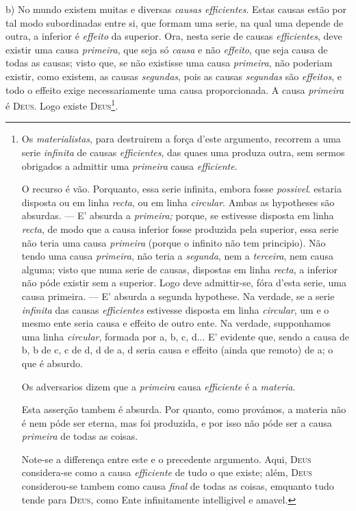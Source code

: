 b) No mundo existem muitas e diversas \emph{causas efficientes}. Estas causas estão por tal modo subordinadas entre si, que formam uma serie, na qual uma depende de outra, a inferior   é \emph{effeito} da superior. Ora, nesta serie de causas \emph{efficientes}, deve existir uma causa \emph{primeira}, que seja só \emph{causa} e não \emph{effeito}, que seja causa de todas as causas; visto que, se não existisse uma  causa \emph{primeira}, não poderiam existir, como existem, as causas \emph{segundas}, pois as causas \emph{segundas} são \emph{effeitos}, e todo o effeito  exige necessariamente uma causa proporcionada. A causa \emph{primeira} é \textsc{Deus}. Logo existe \textsc{Deus}\footnote{Os \emph{materialistas}, para destruirem a força d'este argumento, recorrem a uma serie \emph{infinita} de causas \emph{efficientes}, das quaes uma produza outra, sem sermos obrigados a admittir uma \emph{primeira} causa \emph{efficiente}.\par O recurso é vão. Porquanto, essa serie infinita, embora fosse \emph{possivel}. estaria disposta ou em linha \emph{recta}, ou em linha \emph{circular}. Ambas as hypotheses são absurdas. --- E' absurda a \emph{primeira;} porque, se estivesse disposta em linha \emph{recta}, de modo que a causa inferior fosse produzida pela superior, essa serie não teria uma causa \emph{primeira} (porque o infinito não tem principio). Não tendo uma causa \emph{primeira}, não teria a \emph{segunda}, nem a \emph{terceira}, nem causa alguma; visto que numa serie de causas, dispostas em linha \emph{recta}, a inferior não póde existir sem a superior. Logo deve admittir-se, fóra d'esta serie, uma causa primeira. --- E' absurda a segunda hypothese. Na verdade, se a serie \emph{infinita} das causas \emph{efficientes} estivesse disposta em linha \emph{circular}, um e o mesmo ente seria causa e effeito de outro ente. Na verdade, supponhamos uma linha \emph{circular}, formada por a, b, c, d... E' evidente que, sendo a causa de b, b de c, c de d, d de a, d seria causa e effeito (ainda que remoto) de a; o que é absurdo.\par Os adversarios dizem que a \emph{primeira} causa \emph{efficiente} é a \emph{materia}.\par Esta asserção tambem é absurda. Por quanto, como provámos, a materia não é nem póde ser eterna, mas foi produzida, e por isso não póde ser a causa \emph{primeira} de todas as coisas.\par Note-se a differença entre este e o precedente argumento. Aqui, \textsc{Deus} considera-se como a causa \emph{efficiente} de tudo o que existe; além, \textsc{Deus} considerou-se tambem como causa \emph{final} de todas as coisas, emquanto tudo tende para \textsc{Deus}, como Ente infinitamente intelligivel e amavel.}.

